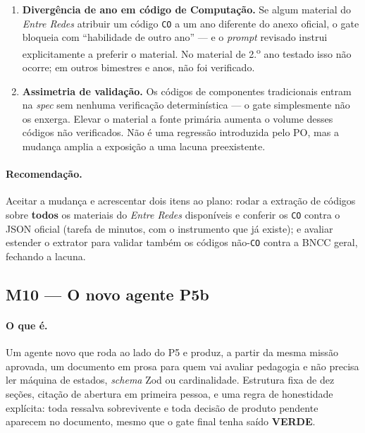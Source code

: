 \documentclass[11pt,a4paper]{article}
\newcommand{\Verde}[1]{\textcolor{verde}{\textbf{#1}}}
\newcommand{\cod}[1]{\texttt{\small #1}}
\begin{document}
\begin{enumerate}[leftmargin=*,itemsep=1pt]
  \item \textbf{Divergência de ano em código de Computação.} Se algum material do \textit{Entre Redes}
  atribuir um código \cod{CO} a um ano diferente do anexo oficial, o gate bloqueia com ``habilidade de outro
  ano'' --- e o \textit{prompt} revisado instrui explicitamente a preferir o material. No material de
  2.\textsuperscript{o} ano testado isso não ocorre; em outros bimestres e anos, não foi verificado.
  \item \textbf{Assimetria de validação.} Os códigos de componentes tradicionais entram na \textit{spec} sem
  nenhuma verificação determinística --- o gate simplesmente não os enxerga. Elevar o material a fonte
  primária aumenta o volume desses códigos não verificados. Não é uma regressão introduzida pelo PO, mas a
  mudança amplia a exposição a uma lacuna preexistente.
\end{enumerate}

\paragraph{Recomendação.} Aceitar a mudança e acrescentar dois itens ao plano: rodar a extração de códigos
sobre \textbf{todos} os materiais do \textit{Entre Redes} disponíveis e conferir os \cod{CO} contra o JSON
oficial (tarefa de minutos, com o instrumento que já existe); e avaliar estender o extrator para validar
também os códigos não-\cod{CO} contra a BNCC geral, fechando a lacuna.

\subsection{M10 --- O novo agente P5b}
\label{sec:m10}

\paragraph{O que é.} Um agente novo que roda ao lado do P5 e produz, a partir da mesma missão aprovada, um
documento em prosa para quem vai avaliar pedagogia e não precisa ler máquina de estados, \textit{schema} Zod
ou cardinalidade. Estrutura fixa de dez seções, citação de abertura em primeira pessoa, e uma regra de
honestidade explícita: toda ressalva sobrevivente e toda decisão de produto pendente aparecem no documento,
mesmo que o gate final tenha saído \Verde{VERDE}.
\end{document}
